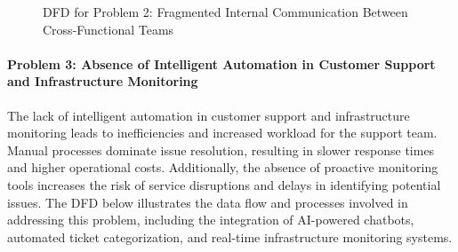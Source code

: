 \begin{figure}[H]
{%
    }
    \caption{DFD for Problem 2: Fragmented Internal Communication Between Cross-Functional Teams}
    \label{fig:problem2_dfd}
\end{figure}
\clearpage

\paragraph{Problem 3: Absence of Intelligent Automation in Customer Support and Infrastructure Monitoring}
The lack of intelligent automation in customer support and infrastructure monitoring leads to inefficiencies and increased workload for the support team. Manual processes dominate issue resolution, resulting in slower response times and higher operational costs. Additionally, the absence of proactive monitoring tools increases the risk of service disruptions and delays in identifying potential issues. The DFD below illustrates the data flow and processes involved in addressing this problem, including the integration of AI-powered chatbots, automated ticket categorization, and real-time infrastructure monitoring systems.

